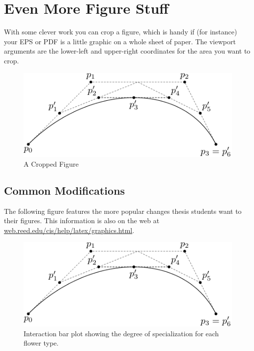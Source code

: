 \documentclass[12pt,twoside]{reedthesis}
\begin{document}
\section{Even More Figure Stuff}
With some clever work you can crop a figure, which is handy if (for instance) your EPS or PDF is a little graphic on a whole sheet of paper. The viewport arguments are the lower-left and upper-right coordinates for the area you want to crop.

 	\begin{figure}[h!]
	    	       \centering
	   \includegraphics[clip=true, viewport=.0in .0in 1in 1in]{subdivision}
	    \caption{A Cropped Figure}
	 \label{subd3}
	\end{figure}
	
      \subsection{Common Modifications}
      The following figure features the more popular changes thesis students want to their figures. This information is also on the web at \url{web.reed.edu/cis/help/latex/graphics.html}.
           \renewcommand{\thefigure}{0.\arabic{figure}} %
    \addtocounter{figure}{4} %
    \begin{figure}[htbp]
    \begin{center}
   \includegraphics[scale=0.5]{subdivision}
    \caption[Flower type and percent specialization]{\footnotesize{Interaction bar plot showing the degree of specialization for each flower type.}} %
    \label{barplot}
    \end{center}
    \end{figure} 
\end{document}
